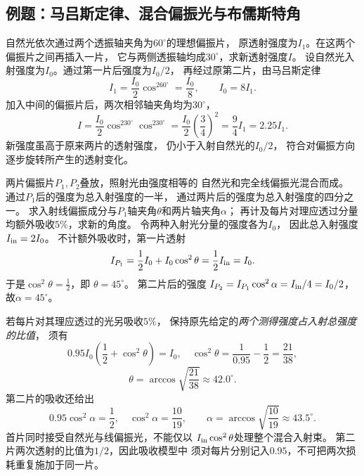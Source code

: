 
\subsection{例题：马吕斯定律、混合偏振光与布儒斯特角}

\problemtext 自然光依次通过两个透振轴夹角为$60^\circ$的理想偏振片，
原透射强度为$I_1$。在这两个偏振片之间再插入一片，
它与两侧透振轴均成$30^\circ$，求新透射强度$I$。
\workings
设自然光入射强度为$I_0$。通过第一片后强度为$I_0/2$，
再经过原第二片，由马吕斯定律
\[
 I_1=\frac{I_0}{2}\cos^260^\circ=\frac{I_0}{8},
 \qquad I_0=8I_1.
\]
加入中间的偏振片后，两次相邻轴夹角均为$30^\circ$，
\[
 I=\frac{I_0}{2}\cos^230^\circ\cos^230^\circ
 =\frac{I_0}{2}\left(\frac34\right)^2
 =\boxed{\frac94 I_1=2.25I_1}.
\]
\crosscheck 新强度虽高于原来两片的透射强度，
仍小于入射自然光的$I_0/2$，
符合对偏振方向逐步旋转所产生的透射变化。

\problemtext 两片偏振片$P_1,P_2$叠放，照射光由强度相等的
自然光和完全线偏振光混合而成。
通过$P_1$后的强度为总入射强度的一半，
通过两片后的强度为总入射强度的四分之一。
求入射线偏振成分与$P_1$轴夹角$\theta$和两片轴夹角$\alpha$；
再计及每片对理应透过分量均额外吸收$5\%$，求新的角度。
\workings
令两种入射光分量的强度各为$I_0$，
因此总入射强度$I_{\rm in}=2I_0$。
不计额外吸收时，第一片透射
\[
 I_{P_1}=\frac12I_0+I_0\cos^2\theta
 =\frac12I_{\rm in}=I_0.
\]
于是$\cos^2\theta=\tfrac12$，即
$\boxed{\theta=45^\circ}$。
第二片后的强度
$I_{P_2}=I_{P_1}\cos^2\alpha
 =I_{\rm in}/4=I_0/2$，
故$\boxed{\alpha=45^\circ}$。

若每片对其理应透过的光另吸收$5\%$，
保持原先给定的\emph{两个测得强度占入射总强度的比值}，
须有
\[
 0.95 I_0\left(\frac12+\cos^2\theta\right)=I_0,
 \quad
 \cos^2\theta=\frac1{0.95}-\frac12=\frac{21}{38},
\]
\[
 \boxed{\theta=\arccos\sqrt{\frac{21}{38}}
 \approx42.0^\circ}.
\]
第二片的吸收还给出
\[
 0.95\cos^2\alpha=\frac12,\quad
 \cos^2\alpha=\frac{10}{19},\qquad
 \boxed{\alpha=\arccos\sqrt{\frac{10}{19}}
 \approx43.5^\circ}.
\]
\crosscheck 首片同时接受自然光与线偏振光，不能仅以
$I_{\rm in}\cos^2\theta$处理整个混合入射束。
第二片两次透射的比值为$1/2$，因此吸收模型中
须对每片分别记入$0.95$，不可把两次损耗重复施加于同一片。

